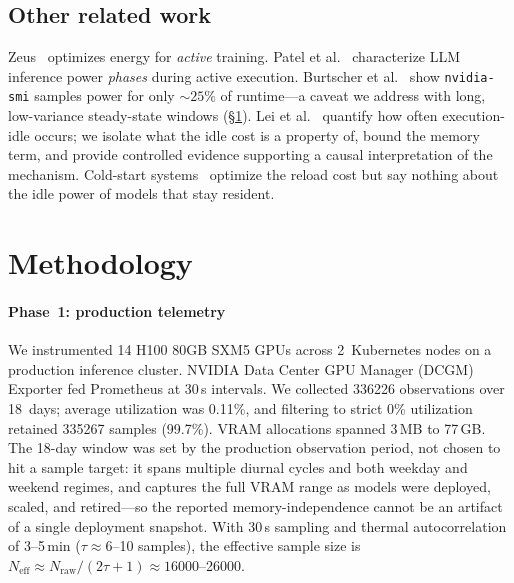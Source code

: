 \documentclass[conference]{IEEEtran}
\begin{document}
\subsection{Other related work}
Zeus~\cite{zeus} optimizes energy for \emph{active} training. Patel et al.~\cite{patel-asplos24} characterize LLM inference power \emph{phases} during active execution. Burtscher et al.~\cite{burtscher-power} show \texttt{nvidia-smi} samples power for only ${\sim}25\%$ of runtime---a caveat we address with long, low-variance steady-state windows (\S\ref{sec:method}). Lei et al.~\cite{lei-idle} quantify how often execution-idle occurs; we isolate what the idle cost is a property of, bound the memory term, and provide controlled evidence supporting a causal interpretation of the mechanism. Cold-start systems~\cite{serverlessllm,nvidia-streamer,hydraserve,lambdascale} optimize the reload cost but say nothing about the idle power of models that stay resident.

\section{Methodology}
\label{sec:method}
\paragraph{Phase~1: production telemetry}
We instrumented 14 H100 80GB SXM5 GPUs across 2~Kubernetes nodes on a production inference cluster. NVIDIA Data Center GPU Manager (DCGM) Exporter fed Prometheus at 30\,s intervals. We collected \num{336226} observations over 18~days; average utilization was 0.11\%, and filtering to strict 0\% utilization retained \num{335267} samples (99.7\%). VRAM allocations spanned 3\,MB to 77\,GB. The 18-day window was set by the production observation period, not chosen to hit a sample target: it spans multiple diurnal cycles and both weekday and weekend regimes, and captures the full VRAM range as models were deployed, scaled, and retired---so the reported memory-independence cannot be an artifact of a single deployment snapshot. With 30\,s sampling and thermal autocorrelation of 3--5\,min ($\tau \approx 6$--10 samples), the effective sample size is $N_{\text{eff}} \approx N_{\text{raw}}/(2\tau+1) \approx \num{16000}$--\num{26000}.
\end{document}
